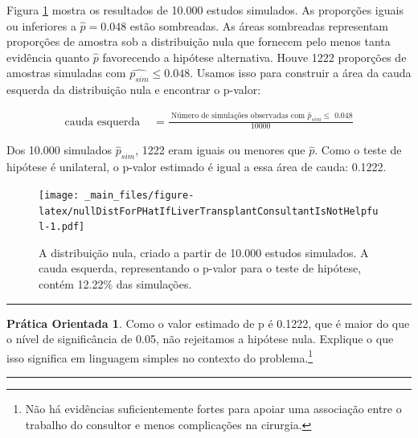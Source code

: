 \documentclass[
]{book}
\theoremstyle{definition}
\theoremstyle{definition}
\theoremstyle{definition}
\newtheorem{exercise}{Prática Orientada}[chapter]
\theoremstyle{definition}
\theoremstyle{remark}
\begin{document}
Figura \ref{fig:nullDistForPHatIfLiverTransplantConsultantIsNotHelpful} mostra os resultados de 10.000 estudos simulados. As proporções iguais ou inferiores a \(\hat{p}=0.048\) estão sombreadas. As áreas sombreadas representam proporções de amostra sob a distribuição nula que fornecem pelo menos tanta evidência quanto \(\hat{p}\) favorecendo a hipótese alternativa. Houve 1222 proporções de amostras simuladas com \(\hat{p _{sim}} \leq 0.048\). Usamos isso para construir a área da cauda esquerda da distribuição nula e encontrar o p-valor:

\begin{align}
\text{cauda esquerda }
    &= \frac{\text{ Número de simulações observadas com }\hat{p}_{sim}\leq\text{ 0.048}}{10000}
    \label{eq:estOfPValueBasedOnSimulatedNullForSingleProportion}
\end{align}

Dos 10.000 simulados \(\hat{p}_{sim}\), 1222 eram iguais ou menores que \(\hat{p}\). Como o teste de hipótese é unilateral, o p-valor estimado é igual a essa área de cauda: 0.1222.

\begin{figure}
\centering
\texttt{[image: \_main\_files/figure-latex/nullDistForPHatIfLiverTransplantConsultantIsNotHelpful-1.pdf]}
\caption{\label{fig:nullDistForPHatIfLiverTransplantConsultantIsNotHelpful}A distribuição nula, criado a partir de 10.000 estudos simulados. A cauda esquerda, representando o p-valor para o teste de hipótese, contém 12.22\% das simulações.}
\end{figure}

\begin{center}\rule{0.5\linewidth}{0.5pt}\end{center}

\begin{exercise}
\protect\hypertarget{exr:plainLanguageExplanationOfHTConclusionForLiverDonorSurgicalConsultant}{}{\label{exr:plainLanguageExplanationOfHTConclusionForLiverDonorSurgicalConsultant} }Como o valor estimado de p é 0.1222, que é maior do que o nível de significância de 0.05, não rejeitamos a hipótese nula. Explique o que isso significa em linguagem simples no contexto do problema.\footnote{Não há evidências suficientemente fortes para apoiar uma associação entre o trabalho do consultor e menos complicações na cirurgia.}
\end{exercise}

\begin{center}\rule{0.5\linewidth}{0.5pt}\end{center}
\end{document}
